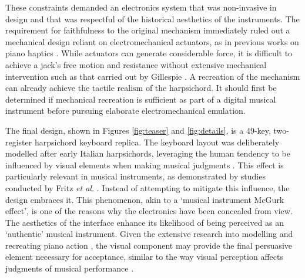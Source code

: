 These constraints demanded an electronics system that was non-invasive in design and that was respectful of the historical aesthetics of the instruments. The requirement for faithfulness to the original mechanism immediately ruled out a mechanical design reliant on electromechanical actuators, as in previous works on piano haptics \cite{Timmermans2020,Gillespie1996}. 
While actuators can generate considerable force, it is difficult to achieve a jack's free motion and resistance without extensive mechanical intervention such as that carried out by Gillespie \cite{Gillespie1996}. A recreation of the mechanism can already achieve the tactile realism of the harpsichord.
It should first be determined if mechanical recreation is sufficient as part of a digital musical instrument before pursuing elaborate electromechanical emulation. 

The final design, shown in Figures \ref{fig:teaser} and \ref{fig:details}, is a 49-key, two-register harpsichord keyboard replica. The keyboard layout was deliberately modelled after early Italian harpsichords, leveraging the human tendency to be influenced by visual elements when making musical judgments \cite{Tsay2013}. This effect is particularly relevant in musical instruments, as demonstrated by studies conducted by Fritz \emph{et al.} \cite{Fritz2012, Fritz2014, Fritz2017}. Instead of attempting to mitigate this influence, the design embraces it. This phenomenon, akin to a `musical instrument McGurk effect’, is one of the reasons why the electronics have been concealed from view. The aesthetics of the interface enhance its likelihood of being perceived as an `authentic' musical instrument. Given the extensive research into modelling and recreating piano action \cite{Cadoz1990, Gillespie1996, Timmermans2020}, the visual component may provide the final persuasive element necessary for acceptance, similar to the way visual perception affects judgments of musical performance \cite{Tsay2013}.

